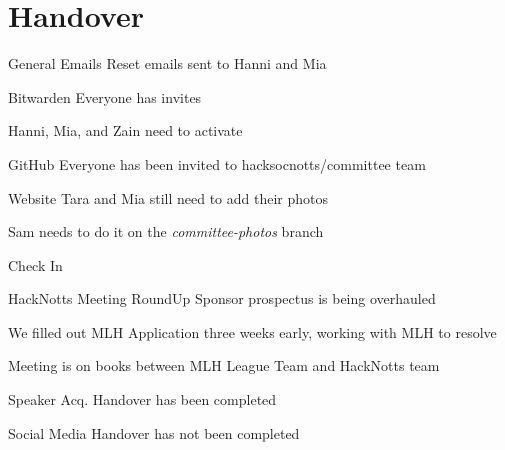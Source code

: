 \documentclass[11pt,hacksoc]{meetingmins}
\begin{document}
\maketitle

\section{Handover}
\begin{items}
	\item
	General
		\subitem
		Emails
			\subsubitem
			Reset emails sent to Hanni and Mia
		
		\subitem
		Bitwarden
			\subsubitem
			Everyone has invites
			
			\subsubitem
			Hanni, Mia, and Zain need to activate
		
		\subitem
		GitHub
			\subsubitem
			Everyone has been invited to hacksocnotts/committee team
		
		\subitem
		Website
			\subsubitem
			Tara and Mia still need to add their photos
			
			\subsubitem
			Sam needs to do it on the \textit{committee-photos} branch

	\item
	Check In
	
		\subitem
		HackNotts Meeting RoundUp
			\subitem
			Sponsor prospectus is being overhauled
			
			\subitem
			We filled out MLH Application three weeks early, working with MLH to resolve
			
			\subitem
			Meeting is on books between MLH League Team and HackNotts team
		
		\subitem
		Speaker Acq.
			\subsubitem
			Handover has been completed
		
		\subitem
		Social Media
			\subsubitem
			Handover has not been completed

\end{items}
\end{document}
